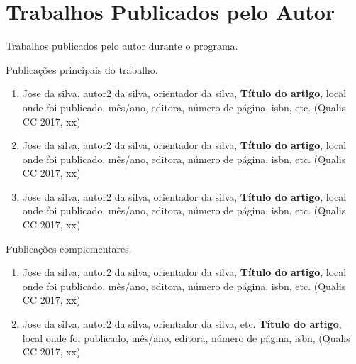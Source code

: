 \documentclass[
	12pt,				%
	openright,			%
	oneside,			%
	a4paper,			%
	tccpreliminar,			%
	]{ABNT-DC-UEL}
\begin{document}
%
\chapter*{Trabalhos Publicados pelo Autor}

\noindent
Trabalhos publicados pelo autor durante o programa.


\vspace{12pt}

\noindent
Publicações principais do trabalho.

\begin{enumerate}

\item Jose da silva, autor2 da silva, orientador da silva, \textbf{Título do artigo}, local onde foi
publicado, mês/ano, editora, número de página, isbn, etc. (Qualis CC 2017, xx)

\item Jose da silva, autor2 da silva, orientador da silva, \textbf{Título do artigo}, local onde foi
publicado, mês/ano, editora, número de página, isbn, etc. (Qualis CC 2017, xx)

\item Jose da silva, autor2 da silva, orientador da silva, \textbf{Título do artigo}, local onde foi
publicado, mês/ano, editora, número de página, isbn, etc. (Qualis CC 2017, xx)

\end{enumerate}

\noindent
Publicações complementares.

\begin{enumerate}

\item Jose da silva, autor2 da silva, orientador da silva, \textbf{Título do artigo}, local onde foi
publicado, mês/ano, editora, número de página, isbn, etc. (Qualis CC 2017, xx)

\item Jose da silva, autor2 da silva, orientador da silva, etc. \textbf{Título do artigo}, local onde foi
publicado, mês/ano, editora, número de página, isbn, (Qualis CC 2017, xx)

\end{enumerate}



\printindex
\end{document}
